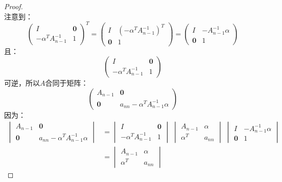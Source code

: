 \begin{proof}
\begin{equation*}
	\end{equation*}
	注意到：
	\begin{equation*}
		\begin{pmatrix}
			I & \mathbf{0} \\
			-\alpha^TA_{n-1}^{-1} & 1
		\end{pmatrix}^T
		=
		\begin{pmatrix}
			I & (-\alpha^TA_{n-1}^{-1})^T \\
			\mathbf{0} & 1
		\end{pmatrix}
		=
		\begin{pmatrix}
			I & -A_{n-1}^{-1}\alpha \\
			\mathbf{0} & 1
		\end{pmatrix}
	\end{equation*}
	且：
	\begin{equation*}
		\begin{pmatrix}
			I & \mathbf{0} \\
			-\alpha^TA_{n-1}^{-1} & 1
		\end{pmatrix}
	\end{equation*}
	可逆，所以$A$合同于矩阵：
	\begin{equation*}
		\begin{pmatrix}
			A_{n-1} & \mathbf{0} \\
			\mathbf{0} & a_{nn}-\alpha^TA_{n-1}^{-1}\alpha
		\end{pmatrix}
	\end{equation*}
	因为：
	\begin{align*}
		\begin{vmatrix}
			A_{n-1} & \mathbf{0} \\
			\mathbf{0} & a_{nn}-\alpha^TA_{n-1}^{-1}\alpha
		\end{vmatrix}
		&=
		\begin{vmatrix}
			I & \mathbf{0} \\
			-\alpha^TA_{n-1}^{-1} & 1
		\end{vmatrix}\;
		\begin{vmatrix}
			A_{n-1} & \alpha \\
			\alpha^T & a_{nn}
		\end{vmatrix}\;
		\begin{vmatrix}
			I & -A_{n-1}^{-1}\alpha \\
			\mathbf{0} & 1
		\end{vmatrix} \\
		&=
		\begin{vmatrix}
			A_{n-1} & \alpha \\
			\alpha^T & a_{nn}

\end{vmatrix}
\end{align*}
\end{proof}
